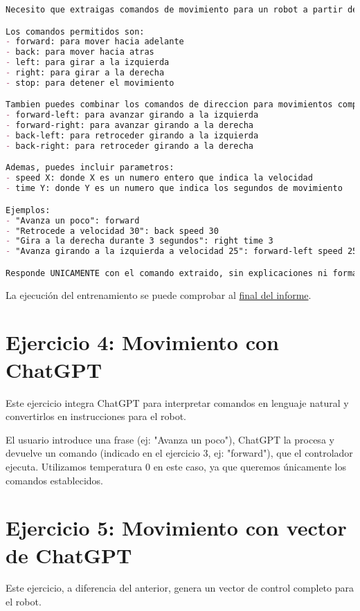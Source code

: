 \documentclass{article}
\begin{document}
\begin{lstlisting}[language=markdown]
Necesito que extraigas comandos de movimiento para un robot a partir de frases en lenguaje natural. 

Los comandos permitidos son:
- forward: para mover hacia adelante
- back: para mover hacia atras
- left: para girar a la izquierda
- right: para girar a la derecha
- stop: para detener el movimiento

Tambien puedes combinar los comandos de direccion para movimientos compuestos como:
- forward-left: para avanzar girando a la izquierda
- forward-right: para avanzar girando a la derecha
- back-left: para retroceder girando a la izquierda
- back-right: para retroceder girando a la derecha

Ademas, puedes incluir parametros:
- speed X: donde X es un numero entero que indica la velocidad
- time Y: donde Y es un numero que indica los segundos de movimiento

Ejemplos:
- "Avanza un poco": forward
- "Retrocede a velocidad 30": back speed 30
- "Gira a la derecha durante 3 segundos": right time 3
- "Avanza girando a la izquierda a velocidad 25": forward-left speed 25

Responde UNICAMENTE con el comando extraido, sin explicaciones ni formato adicional.
\end{lstlisting}

La ejecución del entrenamiento se puede comprobar al \href{ej3}{final del informe}.

\section*{Ejercicio 4: Movimiento con ChatGPT}

Este ejercicio integra ChatGPT para interpretar comandos en lenguaje natural y convertirlos en instrucciones para el robot.

El usuario introduce una frase (ej: "Avanza un poco"), ChatGPT la procesa y devuelve un comando (indicado en el ejercicio 3, ej: "forward"), que el controlador ejecuta. Utilizamos temperatura 0 en este caso, ya que queremos únicamente los comandos establecidos.

\newpage

\section*{Ejercicio 5: Movimiento con vector de ChatGPT}

Este ejercicio, a diferencia del anterior, genera un vector de control completo para el robot.
\end{document}
